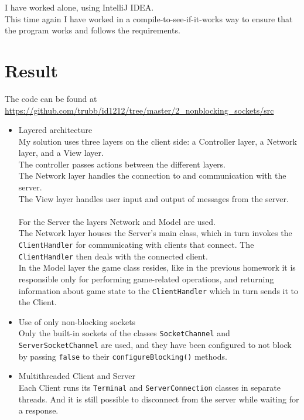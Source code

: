 \documentclass[a4paper]{scrartcl}
\begin{document}
I have worked alone, using IntelliJ IDEA.\\
This time again I have worked in a compile-to-see-if-it-works way to ensure that the program works and follows the requirements.

\section{Result}

The code can be found at\\
\url{https://github.com/trubb/id1212/tree/master/2_nonblocking_sockets/src}

\begin{itemize}
	\item{
		Layered architecture\\
		My solution uses three layers on the client side: a Controller layer, a Network layer, and a View layer.\\
		The controller passes actions between the different layers.\\
		The Network layer handles the connection to and communication with the server.\\
		The View layer handles user input and output of messages from the server.\\
		\\
		For the Server the layers Network and Model are used.\\
		The Network layer houses the Server's main class, which in turn invokes the \texttt{ClientHandler} for communicating with clients that connect. The \texttt{ClientHandler} then deals with the connected client.\\
		In the Model layer the game class resides, like in the previous homework it is responsible only for performing game-related operations, and returning information about game state to the \texttt{ClientHandler} which in turn sends it to the Client.		
	}
	\item{
		Use of only non-blocking sockets\\
		Only the built-in sockets of the classes \texttt{SocketChannel} and \texttt{ServerSocketChannel} are used, and they have been configured to not block by passing \texttt{false} to their \texttt{configureBlocking()} methods.
	}
	\item{
		Multithreaded Client and Server\\
		Each Client runs its \texttt{Terminal} and \texttt{ServerConnection} classes in separate threads. And it is still possible to disconnect from the server while waiting for a response.\\
}
\end{itemize}
\end{document}

